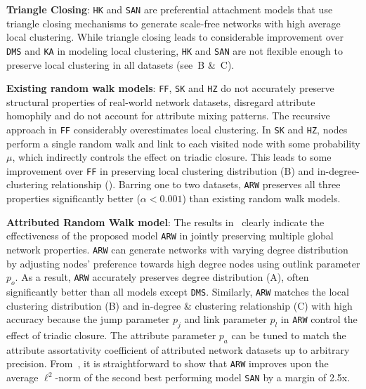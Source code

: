 \textbf{Triangle Closing}: \texttt{HK} and \texttt{SAN} are preferential attachment models
that use triangle closing mechanisms to generate scale-free networks with high average
local clustering.
While triangle closing leads to considerable improvement over \texttt{DMS}
and \texttt{KA} in modeling local clustering, \texttt{HK} and \texttt{SAN} are not flexible enough
to preserve local clustering in {all} datasets (see~B \&~C).

\textbf{Existing random walk models}: \texttt{FF}, \texttt{SK} and \texttt{HZ}
do not accurately preserve structural properties of real-world network datasets,
disregard attribute homophily and do not account for attribute mixing patterns.
The recursive approach in \texttt{FF} considerably overestimates local clustering.
In \texttt{SK} and \texttt{HZ}, nodes perform a single random walk and link to
each visited node with some probability $\mu$, which indirectly
controls the effect on triadic closure. This leads to some improvement over \texttt{FF} in preserving local
clustering distribution (B) and in-degree-clustering relationship ().
Barring one to two datasets, \texttt{ARW} preserves all three properties significantly
better ($\alpha < 0.001$) than existing random walk models.

\textbf{Attributed Random Walk model}: The results in~ clearly indicate the effectiveness
of the proposed model \texttt{ARW} in {jointly} preserving multiple
global network properties. \texttt{ARW} can generate networks with varying
degree distribution by adjusting nodes' preference towards high degree nodes
using outlink parameter $p_o$. As a result, \texttt{ARW} accurately preserves
degree distribution (A), often significantly better
than all models except \texttt{DMS}. Similarly, \texttt{ARW} matches the local clustering
distribution  (B) and in-degree \& clustering relationship
(C) with high accuracy because the jump parameter $p_j$ and
link parameter $p_l$ in \texttt{ARW} control the effect of triadic closure.
The attribute parameter $p_a$ can be tuned to match the attribute assortativity
coefficient of attributed network datasets up to arbitrary precision.
From~, it is straightforward to show that
\texttt{ARW} improves upon the average $\ell^2$-norm of the second best performing model
\texttt{SAN} by a margin of 2.5x.


